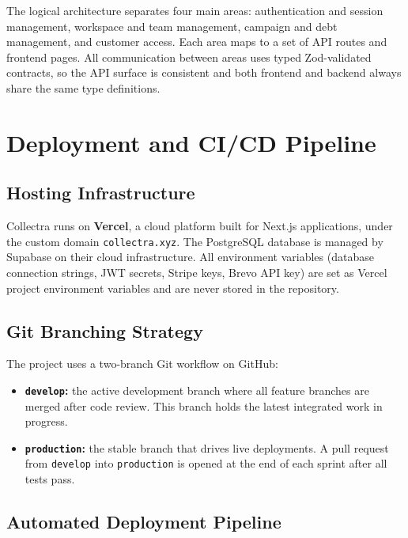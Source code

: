 \documentclass[12pt,a4paper]{report}
\begin{document}
The logical architecture separates four main areas: authentication and session
management, workspace and team management, campaign and debt management, and customer
access.
Each area maps to a set of API routes and frontend pages.
All communication between areas uses typed Zod-validated contracts, so the API
surface is consistent and both frontend and backend always share the same type
definitions.

\section{Deployment and CI/CD Pipeline}
\label{sec:deployment}

\subsection{Hosting Infrastructure}

Collectra runs on \textbf{Vercel}, a cloud platform built for Next.js applications,
under the custom domain \texttt{collectra.xyz}.
The PostgreSQL database is managed by Supabase on their cloud infrastructure.
All environment variables (database connection strings, JWT secrets, Stripe keys,
Brevo API key) are set as Vercel project environment variables and are never stored
in the repository.

\subsection{Git Branching Strategy}

The project uses a two-branch Git workflow on GitHub:

\begin{itemize}
  \item \textbf{\texttt{develop}:} the active development branch where all feature
        branches are merged after code review. This branch holds the latest
        integrated work in progress.
  \item \textbf{\texttt{production}:} the stable branch that drives live
        deployments. A pull request from \texttt{develop} into \texttt{production}
        is opened at the end of each sprint after all tests pass.
\end{itemize}

\subsection{Automated Deployment Pipeline}
\end{document}

